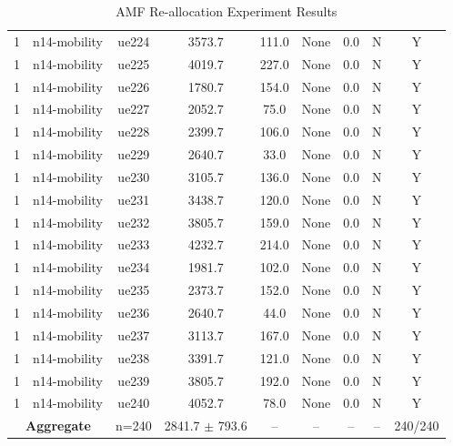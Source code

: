 \begin{table}[ht]
\begin{tabular}{|c|c|c|c|c|c|c|c|c|}
1 & n14-mobility & ue224 & 3573.7 & 111.0 & None & 0.0 & N & Y \\
1 & n14-mobility & ue225 & 4019.7 & 227.0 & None & 0.0 & N & Y \\
1 & n14-mobility & ue226 & 1780.7 & 154.0 & None & 0.0 & N & Y \\
1 & n14-mobility & ue227 & 2052.7 & 75.0 & None & 0.0 & N & Y \\
1 & n14-mobility & ue228 & 2399.7 & 106.0 & None & 0.0 & N & Y \\
1 & n14-mobility & ue229 & 2640.7 & 33.0 & None & 0.0 & N & Y \\
1 & n14-mobility & ue230 & 3105.7 & 136.0 & None & 0.0 & N & Y \\
1 & n14-mobility & ue231 & 3438.7 & 120.0 & None & 0.0 & N & Y \\
1 & n14-mobility & ue232 & 3805.7 & 159.0 & None & 0.0 & N & Y \\
1 & n14-mobility & ue233 & 4232.7 & 214.0 & None & 0.0 & N & Y \\
1 & n14-mobility & ue234 & 1981.7 & 102.0 & None & 0.0 & N & Y \\
1 & n14-mobility & ue235 & 2373.7 & 152.0 & None & 0.0 & N & Y \\
1 & n14-mobility & ue236 & 2640.7 & 44.0 & None & 0.0 & N & Y \\
1 & n14-mobility & ue237 & 3113.7 & 167.0 & None & 0.0 & N & Y \\
1 & n14-mobility & ue238 & 3391.7 & 121.0 & None & 0.0 & N & Y \\
1 & n14-mobility & ue239 & 3805.7 & 192.0 & None & 0.0 & N & Y \\
1 & n14-mobility & ue240 & 4052.7 & 78.0 & None & 0.0 & N & Y \\
\multicolumn{2}{|c|}{\textbf{Aggregate}} & n=240 & 2841.7 $\pm$ 793.6 & -- & -- & -- & -- & 240/240 \\
\hline
\end{tabular}
\caption{AMF Re-allocation Experiment Results}
\label{tab:amf_realloc}
\end{table}
